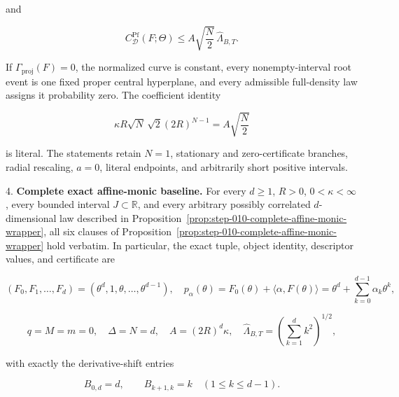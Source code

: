 \begin{proposition}
   and
   
\begin{equation}
\label{eq:appendix-indented-043}
   C^{\mathrm{Pf}}_{\mathcal D}(F;\Theta)
   \leq A\sqrt{\frac N2}\,\widehat\Lambda_{B,T}.
\end{equation}
   
   If \(\Gamma_{\mathrm{proj}}(F)=0\), the normalized curve is constant, every nonempty-interval root event is
   one fixed proper central hyperplane, and every admissible full-density law assigns it probability zero.
   The coefficient identity
   
\begin{equation}
\label{eq:appendix-indented-044}
   \kappa R\sqrt N\,\sqrt2(2R)^{N-1}=A\sqrt{\frac N2}
\end{equation}
   
   is literal. The statements retain \(N=1\), stationary and zero-certificate branches, radial rescaling,
   \(a=0\), literal endpoints, and arbitrarily short positive intervals.

4. \textbf{Complete exact affine-monic baseline.} For every \(d\geq1\), \(R>0\),
   \(0<\kappa<\infty\), every bounded interval \(J\subset\mathbb R\), and every arbitrary possibly correlated
   \(d\)-dimensional law described in Proposition~\ref{prop:step-010-complete-affine-monic-wrapper}, all six clauses of
   Proposition~\ref{prop:step-010-complete-affine-monic-wrapper} hold verbatim. In particular, the exact tuple,
   object identity, descriptor values, and certificate are
   
\begin{equation}
\label{eq:appendix-indented-045}
   (F_0,F_1,\ldots,F_d)=(\theta^d,1,\theta,\ldots,\theta^{d-1}),
   \quad
   p_\alpha(\theta)=F_0(\theta)+\langle\alpha,F(\theta)\rangle
   =\theta^d+\sum_{k=0}^{d-1}\alpha_k\theta^k,
\end{equation}
   
\begin{equation}
\label{eq:appendix-indented-046}
   q=M=m=0,
   \quad \Delta=N=d,
   \quad A=(2R)^d\kappa,
   \quad
   \widehat\Lambda_{B,T}=\left(\sum_{k=1}^{d}k^2\right)^{1/2},
\end{equation}
   
   with exactly the derivative-shift entries
   
\begin{equation}
\label{eq:appendix-indented-047}
   B_{0,d}=d,
   \qquad B_{k+1,k}=k\quad(1\leq k\leq d-1).
\end{equation}
   

\end{proposition}
